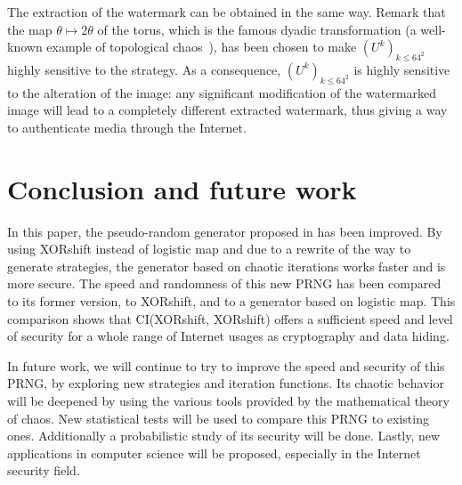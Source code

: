 \documentclass[10pt, a4paper, conference, compsocconf]{IEEEtran}
\begin{document}
The extraction of the watermark can be obtained in the same way. Remark that the map $\theta \mapsto 2\theta $ of the torus, which is the famous dyadic transformation (a well-known example of topological chaos~\cite{Dev89}), has been chosen to make $(U^{k})_{k \leqslant 64^2}$ highly sensitive to the strategy. As a consequence, $(U^{k})_{k \leqslant 64^2}$ is highly sensitive to the alteration of the image: any significant modification of the watermarked image will lead to a completely different extracted watermark, thus giving a way to authenticate media through the Internet.


\section{Conclusion and future work}
\label{Conclusions and Future Work}

In this paper, the pseudo-random generator proposed in \cite{wang2009} has been improved. By using XORshift instead of logistic map and due to a rewrite of the way to generate strategies, the generator based on chaotic iterations works faster and is more secure. The speed and randomness of this new PRNG has been compared to its former version, to XORshift, and to a generator based on logistic map. This comparison shows that CI(XORshift, XORshift) offers a sufficient speed and level of security for a whole range of Internet usages as cryptography and data hiding. 

In future work, we will continue to try to improve the speed and security of this PRNG, by exploring new strategies and iteration functions. Its chaotic behavior will be deepened by using the various tools provided by the mathematical theory of chaos. New statistical tests will be used to compare this PRNG to existing ones. Additionally a probabilistic study of its security will be done. Lastly, new applications in computer science will be proposed, especially in the Internet security field.


\end{document}
